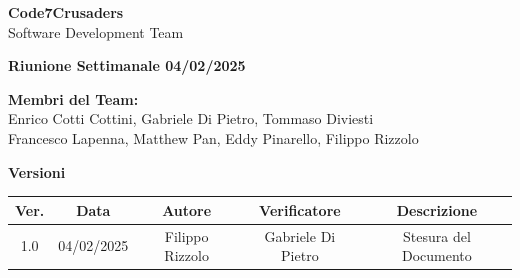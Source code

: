 \documentclass{article}
\begin{document}
\begin{titlepage}
    {\Huge \textbf{Code7Crusaders}}\\
    \vspace{0.5cm}
    {\Large Software Development Team}\\
    \vspace{2cm}
        
        {\large \textbf{Riunione Settimanale 04/02/2025}}\\
    \vspace{5cm}                           %
    
    
    \textbf{Membri del Team:}\\
    Enrico Cotti Cottini, Gabriele Di Pietro, Tommaso Diviesti \\
    Francesco Lapenna, Matthew Pan, Eddy Pinarello, Filippo Rizzolo \\
    \vspace{0.5cm}
    
    \vspace{1cm}
\end{titlepage}



\newpage
\begin{table}[h!]
\centering
\textbf{Versioni} \\ %
\vspace{2mm} %
\begin{tabular}{|c|c|c|c|c|}
    \hline
    \textbf{Ver.} & \textbf{Data} & \textbf{Autore} & \textbf{Verificatore} & \textbf{Descrizione} \\
    \hline
    1.0 & 04/02/2025 & Filippo Rizzolo & Gabriele Di Pietro & Stesura del Documento \\ 
    \hline                                  %
\end{tabular}
\end{table}



\newpage
\end{document}
